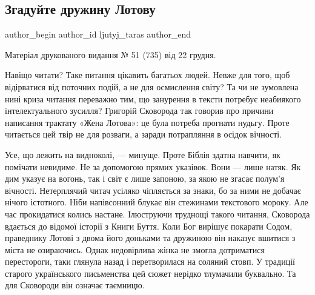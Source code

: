  
 
 
 
 
\subsection{Згадуйте дружину Лотову}
\label{sec:26_12_2021.stz.news.ua.tyzhden.1.druzhyna_lotova}

\ifcmt
 author_begin
   author_id ljutyj_taras
 author_end
\fi

Матеріал друкованого видання № 51 (735) від 22 грудня.

\begin{zznagolos}
Навіщо читати? Таке питання цікавить багатьох людей. Невже для того, щоб
відірватися від поточних подій, а не для осмислення світу? Та чи не зумовлена
нині криза читання переважно тим, що занурення в тексти потребує неабиякого
інтелектуального зусилля? Григорій Сковорода так говорив про причини написання
трактату «Жена Лотова»: це була потреба прогнати нудьгу. Проте читається цей
твір не для розваги, а заради потрапляння в осідок вічності.
\end{zznagolos}

Усе, що лежить на видноколі, — минуще. Проте Біблія здатна навчити, як помічати
невидиме. Не за допомогою прямих указівок. Вони — лише натяк. Як дим указує на
вогонь, так і світ є лише запоною, за якою не згасає полум’я вічності.
Нетерплячий читач усіляко чіпляється за знаки, бо за ними не добачає нічого
істотного. Ніби напівсонний блукає він стежинами текстового мороку. Але час
прокидатися колись настане. Ілюструючи труднощі такого читання, Сковорода
вдається до відомої історії з Книги Буття. Коли Бог вирішує покарати Содом,
праведнику Лотові з двома його доньками та дружиною він наказує вшитися з міста
не озираючись. Однак недовірлива жінка не змогла дотриматися перестороги, таки
глянула назад і перетворилася на соляний стовп. У традиції старого українського
письменства цей сюжет нерідко тлумачили буквально. Та для Сковороди він означає
таємницю.

